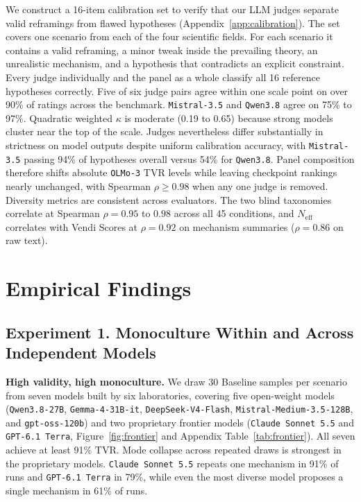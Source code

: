 \documentclass{article}
\begin{document}
We construct a 16-item calibration set to verify that our LLM judges separate valid reframings from flawed hypotheses (Appendix~\ref{app:calibration}). The set covers one scenario from each of the four scientific fields. For each scenario it contains a valid reframing, a minor tweak inside the prevailing theory, an unrealistic mechanism, and a hypothesis that contradicts an explicit constraint. Every judge individually and the panel as a whole classify all 16 reference hypotheses correctly. Five of six judge pairs agree within one scale point on over 90\% of ratings across the benchmark. \texttt{Mistral-3.5} and \texttt{Qwen3.8} agree on 75\% to 97\%. Quadratic weighted $\kappa$ is moderate (0.19 to 0.65) because strong models cluster near the top of the scale. Judges nevertheless differ substantially in strictness on model outputs despite uniform calibration accuracy, with \texttt{Mistral-3.5} passing 94\% of hypotheses overall versus 54\% for \texttt{Qwen3.8}. Panel composition therefore shifts absolute \texttt{OLMo-3} $\mathrm{TVR}$ levels while leaving checkpoint rankings nearly unchanged, with Spearman $\rho \ge 0.98$ when any one judge is removed. Diversity metrics are consistent across evaluators. The two blind taxonomies correlate at Spearman $\rho = 0.95$ to $0.98$ across all 45 conditions, and $N_{\mathrm{eff}}$ correlates with Vendi Scores at $\rho = 0.92$ on mechanism summaries ($\rho = 0.86$ on raw text).

\section{Empirical Findings}
\label{sec:findings}

\subsection{Experiment 1. Monoculture Within and Across Independent Models}

\textbf{High validity, high monoculture.} We draw 30 Baseline samples per scenario from seven models built by six laboratories, covering five open-weight models (\texttt{Qwen3.8-27B}, \texttt{Gemma-4-31B-it}, \texttt{DeepSeek-V4-Flash}, \texttt{Mistral-Medium-3.5-128B}, and \texttt{gpt-oss-120b}) and two proprietary frontier models (\texttt{Claude Sonnet 5.5} and \texttt{GPT-6.1 Terra}, Figure~\ref{fig:frontier} and Appendix Table~\ref{tab:frontier}). All seven achieve at least 91\% $\mathrm{TVR}$. Mode collapse across repeated draws is strongest in the proprietary models. \texttt{Claude Sonnet 5.5} repeats one mechanism in 91\% of runs and \texttt{GPT-6.1 Terra} in 79\%, while even the most diverse model proposes a single mechanism in 61\% of runs.
\end{document}
